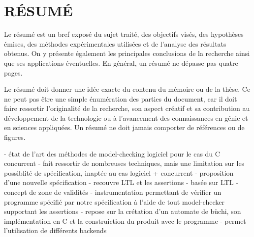%
%
\chapter*{RÉSUMÉ}\thispagestyle{headings}

Le résumé est un bref exposé du sujet traité, des objectifs visés,
des hypothèses émises, des méthodes expérimentales utilisées et de
l'analyse des résultats obtenus. On y présente également les
principales conclusions de la recherche ainsi que ses applications
éventuelles. En général, un résumé ne dépasse pas quatre pages.

Le résumé doit donner une idée exacte du contenu du mémoire ou de la thèse. Ce ne
peut pas être une simple énumération des parties du document, car il
doit faire ressortir l'originalité de la recherche, son aspect
créatif et sa contribution au développement de la technologie ou à
l'avancement des connaissances en génie et en sciences appliquées.
Un résumé ne doit jamais comporter de références ou de figures.

- état de l'art des méthodes de model-checking logiciel pour le cas du C concurrent
    - fait ressortir de nombreuses techniques, mais une limitation sur les
    possiblité de spécification, inaptée au cas logiciel + concurrent
- proposition d'une nouvelle spécification
    - recouvre LTL et les assertions
    - basée sur LTL
    - concept de zone de validités
- instrumentation permettant de vérifier un programme spécifié par notre
spécification à l'aide de tout model-checker supportant les assertions
    - repose sur la crétation d'un automate de büchi, son implémentation en C et
    la construiction du produit avec le programme
    - permet l'utilisation de différents backends
